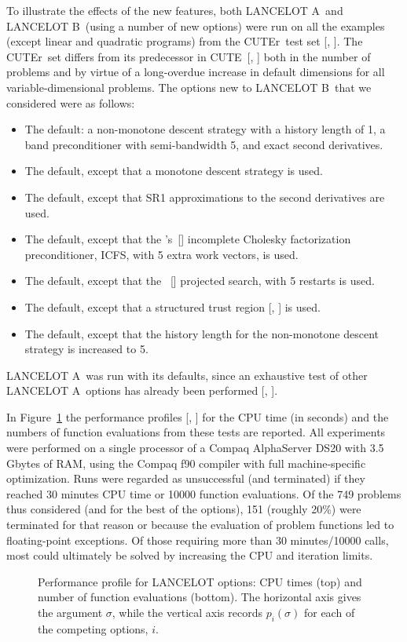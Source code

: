 \documentclass[acmtocl,acmnow]{acmtrans2m}
\newcommand{\lana}{{\sf LANCELOT A}}
\newcommand{\lanb}{{\sf LANCELOT B}}
\newcommand{\cute}{{\sf CUTE}}
\newcommand{\cuter}{{\sf CUTEr}}
\newcommand{\citebb}[1]{\citeauthor{#1}\ [\citeyear{#1}]}
\newcommand{\citebbs}[1]{\citeauthor{#1}'s\ [\citeyear{#1}]}
\newcommand{\bciteb}[1]{\citeauthor{#1}, \citeyear{#1}}
\begin{document}
To illustrate the effects of the new features,
both \lana\ and  \lanb\ (using a number of new options)
were run on all the examples (except linear and quadratic programs) from
the \cuter\ test set [\bciteb{GoulOrbaToin02b}]. The \cuter\
set differs from its predecessor
in \cute\ [\bciteb{BongConnGoulToin95}]
both in the number of problems and by virtue of a long-overdue
increase in default dimensions for all variable-dimensional problems.
The options new to \lanb\ that we considered were as follows:
\begin{itemize}
\item The default: a non-monotone descent strategy with a
history length of 1, a band preconditioner with semi-bandwidth 5,
and exact second derivatives.
\item The default, except that a monotone descent strategy is used.
\item The default, except that SR1 approximations to the second derivatives
are used.
\item The default, except that the \citebbs{LinMore99} incomplete Cholesky
   factorization preconditioner, ICFS, with 5 extra work vectors, is used.
\item The default, except that the \citebb{MoreTora91} projected search,
with 5 restarts is used.
\item The default, except that a structured trust region
   [\bciteb{ConnGoulSartToin96a}] is used.
\item The default, except that the history length for the
non-monotone descent strategy is increased to 5.
\end{itemize}
\lana\ was run with its defaults, since an exhaustive test
of other \lana\ options has already been performed
[\bciteb{ConnGoulToin96a}].

In Figure~\ref{prof.ps}
the performance profiles [\bciteb{DolaMore01}] for the CPU time
(in seconds) and the numbers of function evaluations
from these tests are reported. All experiments were performed
on a single processor of a Compaq AlphaServer DS20 with 3.5 Gbytes of RAM,
using the Compaq f90 compiler with full machine-specific optimization.
Runs were regarded as unsuccessful (and terminated) if they reached
30 minutes CPU time or 10000 function evaluations.
Of the 749 problems thus considered (and for the best of the
options), 151 (roughly 20\%)
were terminated for that reason or because
the evaluation of problem functions led to floating-point exceptions. Of
those requiring more than 30 minutes/10000 calls, most could ultimately
be solved by increasing the CPU and iteration limits.
\begin{figure}[htbp]
\centerline{
}\centerline{
            }
\caption{Performance profile for LANCELOT options: CPU times (top)
and number of function evaluations (bottom). The horizontal axis
gives the argument $\sigma$, while the vertical axis records $p_i(\sigma)$
for each of the competing options, $i$.}
\label{prof.ps}
\end{figure}
\end{document}
